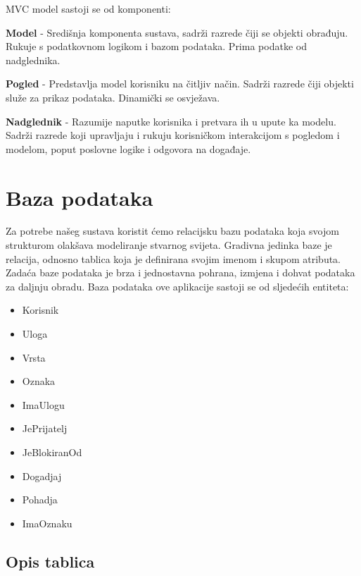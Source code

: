 	\indent MVC model sastoji se od komponenti:
	\begin{packed_item}
		\item 	\textbf{Model} - Središnja komponenta sustava, sadrži razrede čiji se objekti obrađuju. Rukuje s podatkovnom logikom i bazom podataka. Prima podatke od nadglednika.
		\item 	\textbf{Pogled} - Predstavlja model korisniku na čitljiv način. Sadrži razrede čiji objekti služe za prikaz podataka. Dinamički se osvježava.
		\item	\textbf{Nadglednik} - Razumije naputke korisnika i pretvara ih u upute ka modelu. Sadrži razrede koji upravljaju i rukuju korisničkom interakcijom s pogledom i modelom, poput poslovne logike i odgovora na događaje.
	\end{packed_item}

	\eject
		

		

				
		\section{Baza podataka}
			

		
		Za potrebe našeg sustava koristit ćemo relacijsku bazu podataka koja svojom strukturom olakšava modeliranje stvarnog svijeta. Gradivna jedinka baze je relacija, odnosno tablica koja je definirana svojim imenom i skupom atributa. Zadaća baze podataka je brza i jednostavna pohrana, izmjena i dohvat podataka za daljnju obradu. Baza podataka ove aplikacije sastoji se od sljedećih entiteta:
		
		\begin{itemize}
			\item Korisnik
			\item Uloga
			\item Vrsta
			\item Oznaka
			\item ImaUlogu
			\item JePrijatelj
			\item JeBlokiranOd
			\item Dogadjaj
			\item Pohadja
			\item ImaOznaku
			
		\end{itemize}
		
		
			\subsection{Opis tablica}
			

